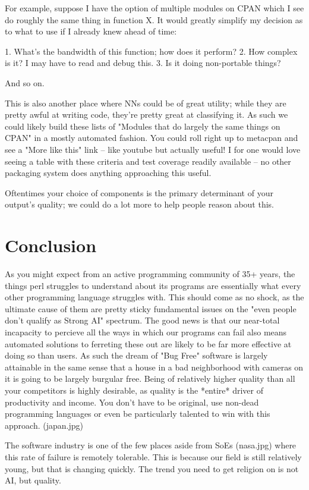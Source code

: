 \documentclass[twoside]{article}
\begin{document}
For example, suppose I have the option of multiple modules on CPAN which I see do roughly the same thing in function X.
It would greatly simplify my decision as to what to use if I already knew ahead of time:

1. What's the bandwidth of this function; how does it perform?
2. How complex is it?  I may have to read and debug this.
3. Is it doing non-portable things?

And so on.

This is also another place where NNs could be of great utility; while they are pretty awful at writing code, they're pretty great at classifying it.
As such we could likely build these lists of "Modules that do largely the same things on CPAN" in a mostly automated fashion.
You could roll right up to metacpan and see a "More like this" link -- like youtube but actually useful!
I for one would love seeing a table with these criteria and test coverage readily available -- no other packaging system does anything approaching this useful.

Oftentimes your choice of components is the primary determinant of your output's quality; we could do a lot more to help people reason about this.

\newpage
\section{Conclusion}

As you might expect from an active programming community of 35+ years, the things perl struggles to understand about its programs are essentially what every other programming language struggles with.
This should come as no shock, as the ultimate cause of them are pretty sticky fundamental issues on the "even people don't qualify as Strong AI" spectrum.
The good news is that our near-total incapacity to percieve all the ways in which our programs can fail also means automated solutions to ferreting these out are likely to be far more effective at doing so than users.
As such the dream of "Bug Free" software is largely attainable in the same sense that a house in a bad neighborhood with cameras on it is going to be largely burgular free.
Being of relatively higher quality than all your competitors is highly desirable, as quality is the *entire* driver of productivity and income.
You don't have to be original, use non-dead programming languages or even be particularly talented to win with this approach. (japan.jpg)

The software industry is one of the few places aside from SoEs (nasa.jpg) where this rate of failure is remotely tolerable.
This is because our field is still relatively young, but that is changing quickly.
The trend you need to get religion on is not AI, but quality.

\newpage


\end{document}
